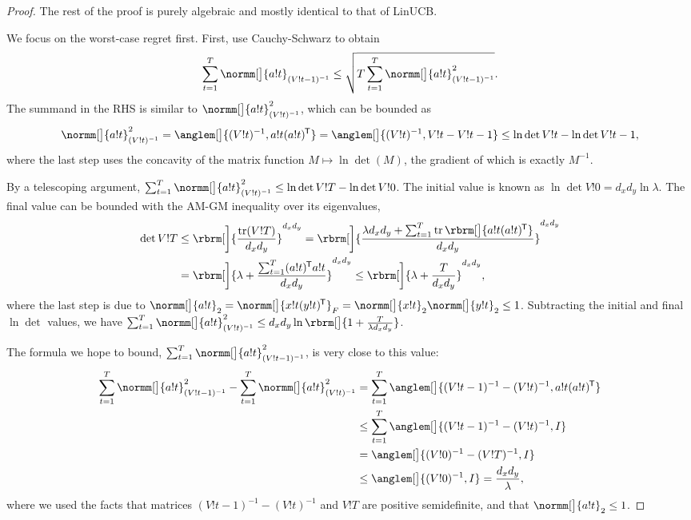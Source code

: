 \begin{proof}
The rest of the proof is purely algebraic and mostly identical to that of LinUCB.

We focus on the worst-case regret first. First, use Cauchy-Schwarz to obtain
\[
    \sum_{t=1}^T \normm[\big]{a!t}_{(V!{t-1})^{-1}}\leq \sqrt{T \sum_{t=1}^T \normm[\big]{a!t}^2_{(V!{t-1})^{-1}}}.
\]
The summand in the RHS is similar to $\normm[\big]{a!t}^2_{(V!{t})^{-1}}$, which can be bounded as
\[
    \normm[\big]{a!t}^2_{(V!{t})^{-1}} 
    = \anglem[\big]{(V!{t})^{-1},a!t (a!t)^\trans} 
    = \anglem[\big]{(V!{t})^{-1},V!t - V!{t-1}}
    \leq \ln \det V!t - \ln \det V!{t-1},
\]
where the last step uses the concavity of the matrix function $M\mapsto \ln\det(M)$, the gradient of which is exactly $M^{-1}$.

By a telescoping argument, $\sum_{t=1}^T \normm[\big]{a!t}^2_{(V!{t})^{-1}}\leq \ln\det V!T-\ln\det V!0$. The initial value is known as $\ln\det V!0=d_x d_y \ln\lambda$. The final value can be bounded with the AM-GM inequality over its eigenvalues,
\begin{align*}
    \det V!T
    & \leq \rbrm[\bigg]{\frac{\trace(V!T)}{d_x d_y}}^{d_x d_y}
    = \rbrm[\bigg]{\frac{\lambda d_x d_y + \sum_{t=1}^{T} \trace\rbrm[\big]{a!t (a!t)^\trans}}{d_x d_y}}^{d_x d_y} \\
    & = \rbrm[\bigg]{\lambda + \frac{\sum_{t=1}^{T} (a!t)^\trans a!t}{d_x d_y}}^{d_x d_y}
    \leq \rbrm[\bigg]{\lambda + \frac{T}{d_x d_y}}^{d_x d_y},
\end{align*}
where the last step is due to $\normm[\big]{a!t}_2=\normm[\big]{x!t (y!t)^\trans}_F=\normm[\big]{x!t}_2\normm[\big]{y!t}_2\leq 1$. Subtracting the initial and final $\ln\det$ values, we have $\sum_{t=1}^T \normm[\big]{a!t}^2_{(V!{t})^{-1}}\leq d_x d_y \ln \rbrm[\big]{1+\frac{T}{\lambda d_x d_y}}$.

The formula we hope to bound, $\sum_{t=1}^T \normm[\big]{a!t}^2_{(V!{t-1})^{-1}}$, is very close to this value:
\begin{align*}
    \sum_{t=1}^T \normm[\big]{a!t}^2_{(V!{t-1})^{-1}}-\sum_{t=1}^T \normm[\big]{a!t}^2_{(V!{t})^{-1}}
    & = \sum_{t=1}^T \anglem[\big]{(V!{t-1})^{-1}-(V!t)^{-1},a!t (a!t)^\trans} \\
    & \leq \sum_{t=1}^T \anglem[\big]{(V!{t-1})^{-1}-(V!t)^{-1},I} \\
    & = \anglem[\big]{(V!{0})^{-1}-(V!T)^{-1},I} \\
    & \leq \anglem[\big]{(V!{0})^{-1},I}=\frac{d_x d_y}{\lambda},
\end{align*}
where we used the facts that matrices $(V!{t-1})^{-1}-(V!t)^{-1}$ and $V!T$ are positive semidefinite, and that $\normm[\big]{a!t}_2\leq 1$.


\end{proof}
